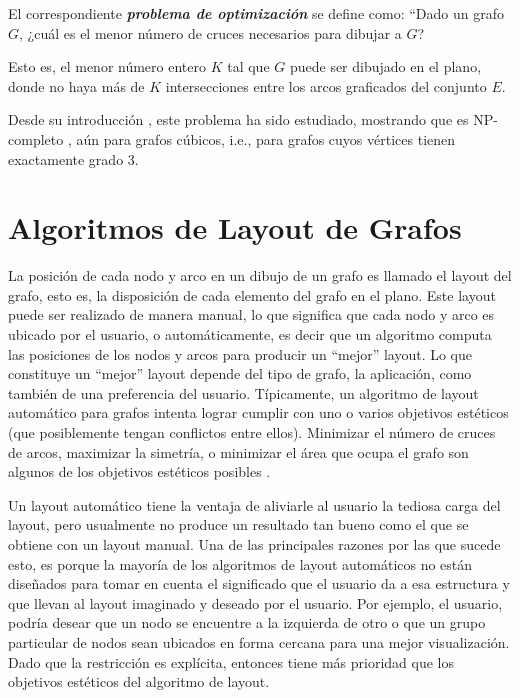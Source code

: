 El correspondiente \emph{\bf problema de optimización} se define como\cite{turan1977note}:  ``Dado un grafo $G$, ¿cuál es el 
menor número de cruces necesarios para dibujar a $G$?

Esto es, el menor número entero $K$ tal que $G$ puede ser dibujado en el plano, donde no haya más de $K$ intersecciones entre los arcos graficados del conjunto $E$.


Desde su introducción \cite{turan1977note}, este problema ha sido estudiado, mostrando que  es NP-completo \cite{garey1983crossing}, aún para grafos cúbicos\cite{hlinveny2006crossing}, i.e., para grafos cuyos vértices tienen exactamente  grado 3.


\section{Algoritmos de Layout de Grafos}

La posición de cada nodo y arco en un dibujo  de un grafo  es llamado el layout del grafo, esto es, la disposición de cada elemento del grafo en el plano. Este layout puede ser realizado de manera manual, lo que significa que cada nodo y arco es ubicado por el usuario, o automáticamente, es decir que un algoritmo computa las posiciones de los nodos y arcos para producir un ``mejor'' layout. Lo que constituye un ``mejor'' layout depende del tipo de grafo, la aplicación, como también de una preferencia del usuario. Típicamente, un algoritmo de layout automático para grafos intenta lograr cumplir con uno o varios objetivos estéticos (que posiblemente tengan conflictos entre ellos). Minimizar el número de cruces de arcos, maximizar la simetría, o minimizar el área que ocupa el grafo son algunos de los objetivos estéticos posibles \cite{bohringer1990using}.

Un layout automático tiene la ventaja de aliviarle al usuario la tediosa carga del layout, pero usualmente no produce un resultado tan bueno como el que se obtiene con un layout manual. Una de las principales razones por las que sucede esto, es porque la mayoría de los algoritmos de layout automáticos no están diseñados para tomar en cuenta el significado que el usuario da a esa estructura y que llevan al layout imaginado y deseado  por el usuario. Por ejemplo, el usuario, podría desear que un nodo se encuentre a la izquierda de otro o que un grupo particular de nodos sean ubicados en forma cercana para una mejor visualización. Dado que la restricción es explícita, entonces tiene más prioridad que los objetivos estéticos del algoritmo de layout.

